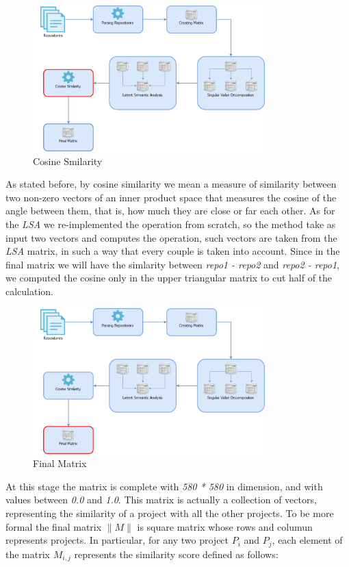 \begin{figure}[!h]
	\centering
	\includegraphics[width=0.8\textwidth]{images/Architecture5.png}
	\caption{Cosine Smilarity}
\end{figure}

As stated before, by cosine similarity we mean a measure of similarity between two non-zero vectors of an inner product space that measures the cosine of the angle between them, that is, how much they are close or far each other. As for the \emph{LSA} we re-implemented the operation from scratch, so the method take as input two vectors and computes the operation, such vectors are taken from the \emph{LSA} matrix, in such a way that every couple is taken into account. Since in the final matrix we will have the simlarity between \emph{repo1 - repo2} and \emph{repo2 - repo1}, we computed the cosine only in the upper triangular matrix to cut half of the calculation.

\begin{figure}[!h]
	\centering
	\includegraphics[width=0.8\textwidth]{images/Architecture6.png}
	\caption{Final Matrix}
\end{figure}

At this stage the matrix is complete with \emph{580 * 580} in dimension, and with values between \emph{0.0} and \emph{1.0}.
This matrix is actually a collection of vectors, representing the similarity of a project with all the other projects.
To be more formal the final matrix $\| M \|$ is square matrix whose rows and columun represents projects. In particular, for any two project $P_i$ and $P_j$, each element of the matrix $M_{i,j}$ represents the similarity score defined as follows: \\

